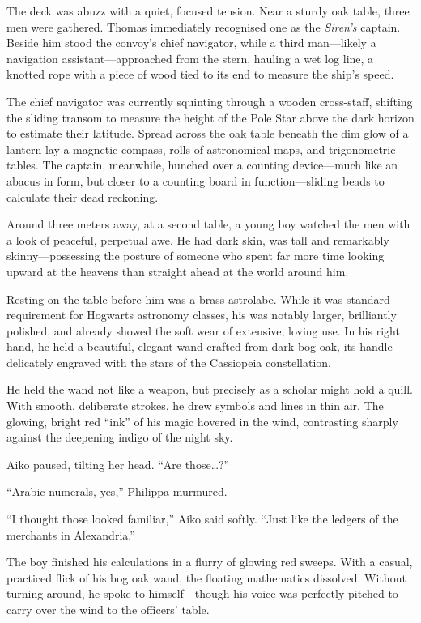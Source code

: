 The deck was abuzz with a quiet, focused tension. Near a sturdy oak table, three men were gathered. Thomas immediately recognised one as the \textit{Siren's} captain. Beside him stood the convoy's chief navigator, while a third man---likely a navigation assistant---approached from the stern, hauling a wet log line, a knotted rope with a piece of wood tied to its end to measure the ship's speed.

The chief navigator was currently squinting through a wooden cross-staff, shifting the sliding transom to measure the height of the Pole Star above the dark horizon to estimate their latitude. Spread across the oak table beneath the dim glow of a lantern lay a magnetic compass, rolls of astronomical maps, and trigonometric tables. The captain, meanwhile, hunched over a counting device---much like an abacus in form, but closer to a counting board in function---sliding beads to calculate their dead reckoning.

Around three meters away, at a second table, a young boy watched the men with a look of peaceful, perpetual awe. He had dark skin, was tall and remarkably skinny---possessing the posture of someone who spent far more time looking upward at the heavens than straight ahead at the world around him.

Resting on the table before him was a brass astrolabe. While it was standard requirement for Hogwarts astronomy classes, his was notably larger, brilliantly polished, and already showed the soft wear of extensive, loving use. In his right hand, he held a beautiful, elegant wand crafted from dark bog oak, its handle delicately engraved with the stars of the Cassiopeia constellation.

He held the wand not like a weapon, but precisely as a scholar might hold a quill. With smooth, deliberate strokes, he drew symbols and lines in thin air. The glowing, bright red \enquote{ink} of his magic hovered in the wind, contrasting sharply against the deepening indigo of the night sky.

Aiko paused, tilting her head. \enquote{Are those\ldots{}?}

\enquote{Arabic numerals, yes,} Philippa murmured.

\enquote{I thought those looked familiar,} Aiko said softly. \enquote{Just like the ledgers of the merchants in Alexandria.}

The boy finished his calculations in a flurry of glowing red sweeps. With a casual, practiced flick of his bog oak wand, the floating mathematics dissolved. Without turning around, he spoke to himself---though his voice was perfectly pitched to carry over the wind to the officers' table.

